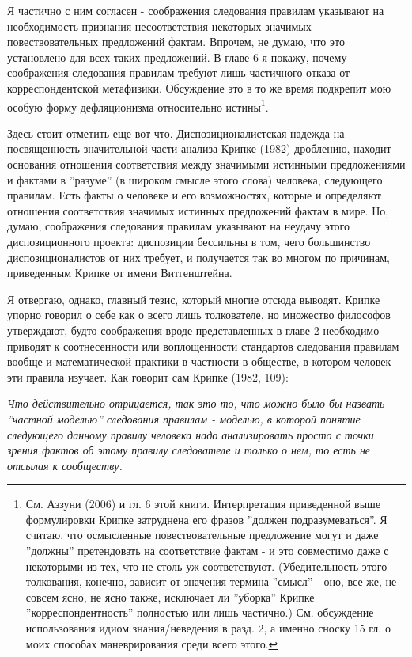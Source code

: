 \documentclass[12pt]{book}
\begin{document}
\smallskip

Я частично с ним согласен - соображения следования правилам указывают на необходимость признания несоответствия некоторых значимых повествовательных предложений фактам. Впрочем, не думаю, что это установлено для всех таких предложений. В главе 6 я покажу, почему соображения следования правилам требуют лишь частичного отказа от корреспондентской метафизики. Обсуждение это в то же время подкрепит мою особую форму дефляционизма относительно истины\footnote{См. Аззуни (2006) и гл. 6 этой книги. Интерпретация приведенной выше формулировки Крипке затруднена его фразов ''должен подразумеваться''. Я считаю, что осмысленные повествовательные предложение могут и даже ''должны'' претендовать на соответствие фактам - и это совместимо даже с некоторыми из тех, что не столь уж соответствуют. (Убедительность этого толкования, конечно, зависит от значения термина ''смысл'' - оно, все же, не совсем ясно, не ясно также, исключает ли ''уборка'' Крипке ''корреспондентность'' полностью или лишь частично.) См. обсуждение использования идиом знания/неведения в разд. 2, а именно сноску 15 гл. о моих способах маневрирования среди всего этого.}.

Здесь стоит отметить еще вот что. Диспозиционалистская надежда на посвященность значительной части анализа Крипке (1982) дроблению, находит основания отношения соответствия между значимыми истинными предложениями и фактами в ''разуме'' (в широком смысле этого слова) человека, следующего правилам. Есть факты о человеке и его возможностях, которые и определяют отношения соответствия значимых истинных предложений фактам в мире. Но, думаю, соображения следования правилам указывают на неудачу этого диспозиционного проекта: диспозиции бессильны в том, чего большинство диспозиционалистов от них требует, и получается так во многом по причинам, приведенным Крипке от имени Витгенштейна.

Я отвергаю, однако, главный тезис, который многие отсюда выводят. Крипке упорно говорил о себе как о всего лишь толкователе, но множество философов утверждают, будто соображения вроде представленных в главе 2 необходимо приводят к соотнесенности или воплощенности стандартов следования правилам вообще и математической практики в частности в обществе, в котором человек эти правила изучает. Как говорит сам Крипке (1982, 109):

\smallskip

\textit{Что действительно отрицается, так это то, что можно было бы назвать ''частной моделью'' следования правилам - моделью, в которой понятие следующего данному правилу человека надо анализировать просто с точки зрения фактов об этому правилу следователе и только о нем, то есть не отсылая к сообществу.}
\end{document}
